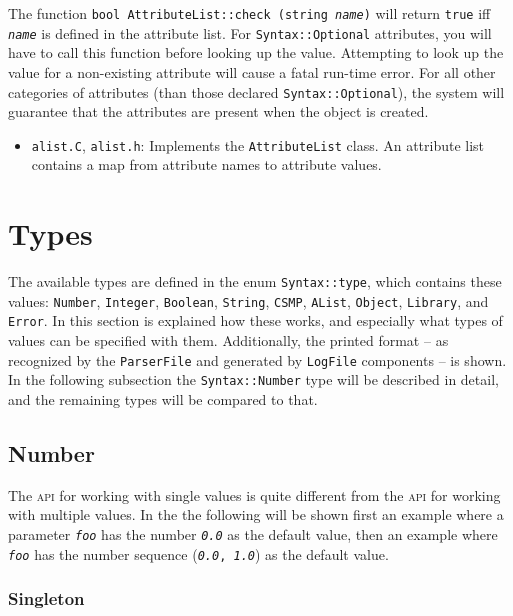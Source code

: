\documentclass{article}
\newcommand{\code}[1]{\texttt{#1}}
\newcommand{\file}[1]{\texttt{#1}}
\begin{document}
The function \code{bool AttributeList::check (string \textit{name})}
will return \code{true} iff \texttt{\textit{name}} is defined in the
attribute list.  For \code{Syntax::Optional} attributes, you will have
to call this function before looking up the value.  Attempting to look
up the value for a non-existing attribute will cause a fatal run-time
error.  For all other categories of attributes (than those declared
\code{Syntax::Optional}), the system will guarantee that the
attributes are present when the object is created.

\begin{itemize}
\item \file{alist.C}, \file{alist.h}: Implements the
  \code{AttributeList} class.  An attribute list contains a map from
  attribute names to attribute values.
\end{itemize}

\section{Types}
\label{sec:types}

The available types are defined in the enum \code{Syntax::type}, which
contains these values: \code{Number}, \code{Integer}, \code{Boolean},
\code{String}, \code{CSMP}, \code{AList}, \code{Object},
\code{Library}, and \code{Error}.  In this section is explained how
these works, and especially what types of values can be specified with
them.  Additionally, the printed format -- as recognized by the
\code{ParserFile} and generated by \code{LogFile} components -- is
shown.  In the following subsection the \code{Syntax::Number} type
will be described in detail, and the remaining types will be compared
to that.

\subsection{Number}

The \textsc{api} for working with single values is quite different
from the \textsc{api} for working with multiple values.  In the the
following will be shown first an example where a parameter
\texttt{\textit{foo}} has the number \texttt{\textit{0.0}} as the
default value, then an example where \texttt{\textit{foo}} has the
number sequence (\texttt{\textit{0.0}, \textit{1.0}}) as the default
value.

\subsubsection{Singleton}
\end{document}
